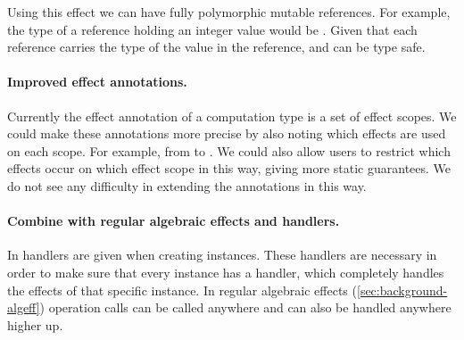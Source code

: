 Using this effect we can have fully polymorphic mutable references.
For example, the type of a reference holding an integer value would be .
Given that each reference carries the type of the value in the reference,  and  can be type safe.

\iffalse
\paragraph{Polymorphic operations.}
Polymorphism in operations can also be useful for some effects.
For example an exception effect:
\begin{verbatim}
effect Exception {
	throw : forall t. String -> t
}
\end{verbatim}
Here, because we do not expect to continue a computation after an exception has been throw, we can let the \ident{throw} operation return any type.
This makes it convenient to throw errors, for example in an if-expression where the type of both branches have to match.
Adding polymorphic operations takes some more thought because in the case of operations like \ident{throw} we cannot allow a handler to call the continuation.
\\\\
Another example is if we define an effect that is suppose to wrap the creation of a \ident{State} instance:
\begin{verbatim}
effect CreateRef {
	ref : forall s. Int -> Inst s State
}
\end{verbatim}
Here, we want to call the \ident{ref} operation to create a new instance.

\fi

\paragraph{Improved effect annotations.}
Currently the effect annotation of a computation type is a set of effect scopes.
We could make these annotations more precise by also noting which effects are used on each scope.
For example, from  to .
We could also allow users to restrict which effects occur on which effect scope in this way, giving more static guarantees.
We do not see any difficulty in extending the annotations in this way.

\paragraph{Combine with regular algebraic effects and handlers.}
In \lang{} handlers are given when creating instances.
These handlers are necessary in order to make sure that every instance has a handler, which completely handles the effects of that specific instance.
In regular algebraic effects (\cref{sec:background-algeff}) operation calls can be called anywhere and can also be handled anywhere higher up.

